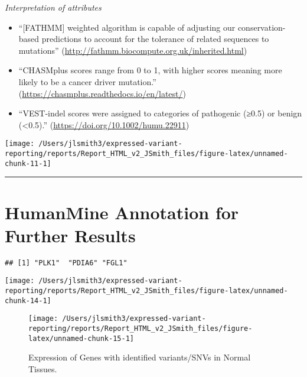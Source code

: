 \documentclass[
]{article}
\providecommand{\tightlist}{%
  \setlength{\itemsep}{0pt}\setlength{\parskip}{0pt}}
\begin{document}
\emph{Interpretation of attributes}

\begin{itemize}
\tightlist
\item
  ``{[}FATHMM{]} weighted algorithm is capable of adjusting our
  conservation-based predictions to account for the tolerance of related
  sequences to mutations''
  (\url{http://fathmm.biocompute.org.uk/inherited.html})
\item
  ``CHASMplus scores range from 0 to 1, with higher scores meaning more
  likely to be a cancer driver mutation.''
  (\url{https://chasmplus.readthedocs.io/en/latest/})
\item
  ``VEST‐indel scores were assigned to categories of pathogenic (≥0.5)
  or benign (\textless0.5).'' (\url{https://doi.org/10.1002/humu.22911})
\end{itemize}

\begin{center}\texttt{[image: /Users/jlsmith3/expressed-variant-reporting/reports/Report\_HTML\_v2\_JSmith\_files/figure-latex/unnamed-chunk-11-1]} \end{center}

\begin{center}\rule{0.5\linewidth}{0.5pt}\end{center}

\hypertarget{humanmine-annotation-for-further-results}{%
\section{HumanMine Annotation for Further
Results}\label{humanmine-annotation-for-further-results}}

\begin{verbatim}
## [1] "PLK1"  "PDIA6" "FGL1"
\end{verbatim}

\begin{center}\texttt{[image: /Users/jlsmith3/expressed-variant-reporting/reports/Report\_HTML\_v2\_JSmith\_files/figure-latex/unnamed-chunk-14-1]} \end{center}

\begin{figure}

{\centering \texttt{[image: /Users/jlsmith3/expressed-variant-reporting/reports/Report\_HTML\_v2\_JSmith\_files/figure-latex/unnamed-chunk-15-1]} 

}

\caption{Expression of Genes with identified variants/SNVs in Normal Tissues.}\label{fig:unnamed-chunk-15}
\end{figure}
\end{document}
